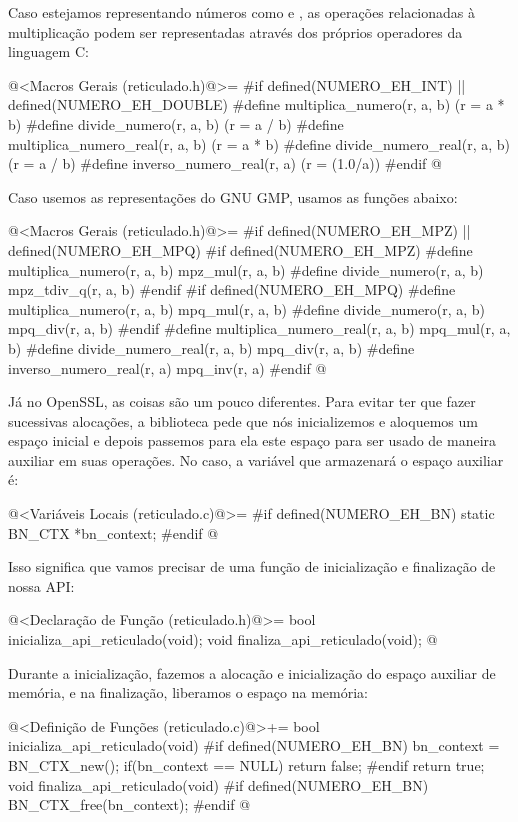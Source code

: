 Caso estejamos representando números como 
e , as operações relacionadas à multiplicação podem
ser representadas através dos próprios operadores da linguagem C:

\iniciocodigo
@<Macros Gerais (reticulado.h)@>=
#if defined(NUMERO_EH_INT) || defined(NUMERO_EH_DOUBLE)
#define multiplica_numero(r, a, b) (r = a * b)
#define divide_numero(r, a, b) (r = a / b)
#define multiplica_numero_real(r, a, b) (r = a * b)
#define divide_numero_real(r, a, b) (r = a / b)
#define inverso_numero_real(r, a) (r = (1.0/a))
#endif
@
\fimcodigo

Caso usemos as representações do GNU GMP, usamos as funções abaixo:

\iniciocodigo
@<Macros Gerais (reticulado.h)@>=
#if defined(NUMERO_EH_MPZ) || defined(NUMERO_EH_MPQ)
#if defined(NUMERO_EH_MPZ)
#define multiplica_numero(r, a, b) mpz_mul(r, a, b)
#define divide_numero(r, a, b) mpz_tdiv_q(r, a, b)
#endif
#if defined(NUMERO_EH_MPQ)
#define multiplica_numero(r, a, b) mpq_mul(r, a, b)
#define divide_numero(r, a, b) mpq_div(r, a, b)
#endif
#define multiplica_numero_real(r, a, b) mpq_mul(r, a, b)
#define divide_numero_real(r, a, b) mpq_div(r, a, b)
#define inverso_numero_real(r, a) mpq_inv(r, a)
#endif
@
\fimcodigo

Já no OpenSSL, as coisas são um pouco diferentes. Para evitar ter que
fazer sucessivas alocações, a biblioteca pede que nós inicializemos e
aloquemos um espaço inicial e depois passemos para ela este espaço
para ser usado de maneira auxiliar em suas operações. No caso, a
variável que armazenará o espaço auxiliar é:

\iniciocodigo
@<Variáveis Locais (reticulado.c)@>=
#if defined(NUMERO_EH_BN)
static BN_CTX *bn_context;
#endif
@
\fimcodigo

Isso significa que vamos precisar de uma função de inicialização e
finalização de nossa API:

\iniciocodigo
@<Declaração de Função (reticulado.h)@>=
bool inicializa_api_reticulado(void);
void finaliza_api_reticulado(void);
@
\fimcodigo

Durante a inicialização, fazemos a alocação e inicialização do espaço
auxiliar de memória, e na finalização, liberamos o espaço na memória:

\iniciocodigo
@<Definição de Funções (reticulado.c)@>+=
bool inicializa_api_reticulado(void){
#if defined(NUMERO_EH_BN)
  bn_context = BN_CTX_new();
  if(bn_context == NULL)
    return false;
#endif
  return true;
}
void finaliza_api_reticulado(void){
#if defined(NUMERO_EH_BN)
  BN_CTX_free(bn_context);
#endif
}
@
\fimcodigo

